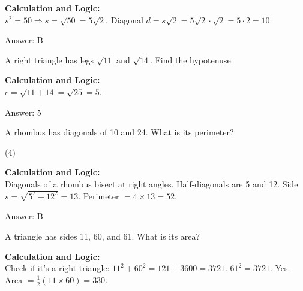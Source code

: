 \documentclass[11pt,paper=a4,answers]{exam}
\begin{document}
\begin{questions}
\begin{solution}
\textbf{Calculation and Logic:} \\
$s^2 = 50 \Rightarrow s = \sqrt{50} = 5\sqrt{2}$. Diagonal $d = s\sqrt{2} = 5\sqrt{2} \cdot \sqrt{2} = 5 \cdot 2 = 10$.

\vspace{30pt}

Answer: \colorbox{yellow!100}{B}
\end{solution}

\vspace{60pt}

\question
A right triangle has legs $\sqrt{11}$ and $\sqrt{14}$. Find the hypotenuse.

\begin{solution}
\textbf{Calculation and Logic:} \\
$c = \sqrt{11 + 14} = \sqrt{25} = 5$.

\vspace{30pt}

Answer: \colorbox{yellow!100}{5}
\end{solution}

\vspace{60pt}

\question
A rhombus has diagonals of 10 and 24. What is its perimeter?
\begin{tasks}(4)
\end{tasks}

\begin{solution}
\textbf{Calculation and Logic:} \\
Diagonals of a rhombus bisect at right angles. Half-diagonals are 5 and 12. Side $s = \sqrt{5^2 + 12^2} = 13$. Perimeter $= 4 \times 13 = 52$.

\vspace{30pt}

Answer: \colorbox{yellow!100}{B}
\end{solution}

\vspace{60pt}

\question
A triangle has sides 11, 60, and 61. What is its area?

\begin{solution}
\textbf{Calculation and Logic:} \\
Check if it's a right triangle: $11^2 + 60^2 = 121 + 3600 = 3721$. $61^2 = 3721$. Yes. Area $= \frac{1}{2}(11 \times 60) = 330$.


\end{solution}
\end{questions}
\end{document}

